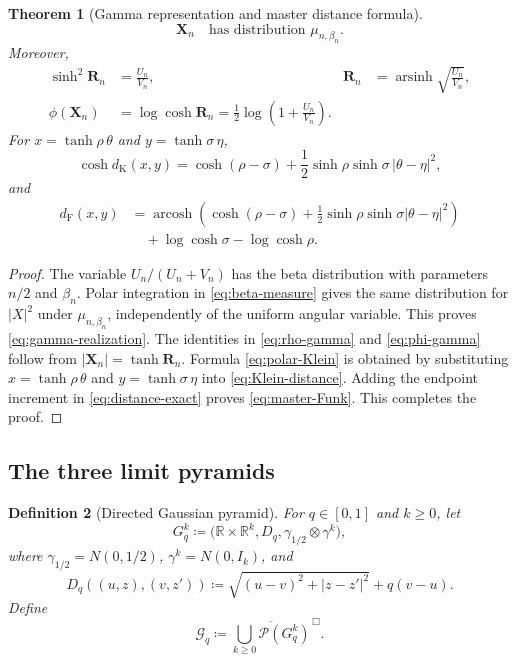 \documentclass[10pt,a4paper]{amsart}
\numberwithin{equation}{section}
\newtheorem{theorem}{Theorem}[section]
\newtheorem{definition}[theorem]{Definition}
\newcommand{\R}{\mathbb R}
\newcommand{\Pyr}{\mathcal P}
\DeclareMathOperator{\arcosh}{arcosh}
\DeclareMathOperator{\arsinh}{arsinh}
\newcommand{\dF}{d_{\mathrm F}}
\newcommand{\dK}{d_{\mathrm K}}
\begin{document}
\begin{theorem}[Gamma representation and master distance formula]\label{thm:gamma-master}
\begin{equation}\label{eq:gamma-realization} \mathbf X_n\quad\text{has distribution }\mu_{n,\beta_n}. \end{equation}
Moreover,
\begin{align}
 \sinh^2\mathbf R_n&=\frac{U_n}{V_n},
 &\mathbf R_n&=\arsinh\sqrt{\frac{U_n}{V_n}},
 \label{eq:rho-gamma}\\
 \phi(\mathbf X_n)&=\log\cosh\mathbf R_n
 =\frac12\log\left(1+\frac{U_n}{V_n}\right).
 \label{eq:phi-gamma}
\end{align}
For $x=\tanh\rho\,\theta$ and $y=\tanh\sigma\,\eta$,
\begin{equation}\label{eq:polar-Klein} \cosh\dK(x,y) =\cosh(\rho-\sigma) +\frac12\sinh\rho\sinh\sigma\,|\theta-\eta|^2, \end{equation}
and
\begin{equation}\label{eq:master-Funk}
 \begin{split}
\dF(x,y) &=\arcosh\left( \cosh(\rho-\sigma) +\frac12\sinh\rho\sinh\sigma|\theta-\eta|^2 \right)\\
 &\quad+\log\cosh\sigma-\log\cosh\rho.
 \end{split}
\end{equation}
\end{theorem}

\begin{proof}
The variable $U_n/(U_n+V_n)$ has the beta distribution with parameters $n/2$ and $\beta_n$.  Polar integration in \eqref{eq:beta-measure} gives the same distribution for $|X|^2$ under $\mu_{n,\beta_n}$, independently of the uniform angular variable.  This proves \eqref{eq:gamma-realization}.  The identities in \eqref{eq:rho-gamma} and \eqref{eq:phi-gamma} follow from $|\mathbf X_n|=\tanh\mathbf R_n$.  Formula \eqref{eq:polar-Klein} is obtained by substituting $x=\tanh\rho\,\theta$ and $y=\tanh\sigma\,\eta$ into \eqref{eq:Klein-distance}.  Adding the endpoint increment in \eqref{eq:distance-exact} proves \eqref{eq:master-Funk}.
This completes the proof.
\end{proof}


\subsection{The three limit pyramids}

\begin{definition}[Directed Gaussian pyramid]\label{def:directed-gaussian}
For $q\in[0,1]$ and $k\ge0$, let
\[ G_q^k\coloneqq\bigl(\R\times\R^k,D_q,\gamma_{1/2}\otimes\gamma^k\bigr), \]
where $\gamma_{1/2}=N(0,1/2)$, $\gamma^k=N(0,I_k)$, and
\begin{equation}\label{eq:Dq} D_q((u,z),(v,z'))\coloneqq\sqrt{(u-v)^2+|z-z'|^2}+q(v-u). \end{equation}
Define
\begin{equation}\label{eq:Gq-pyramid} \mathcal G_q\coloneqq\overline{\bigcup_{k\ge0}\Pyr(G_q^k)}^{\,\Box}. \end{equation}
\end{definition}
\end{document}
